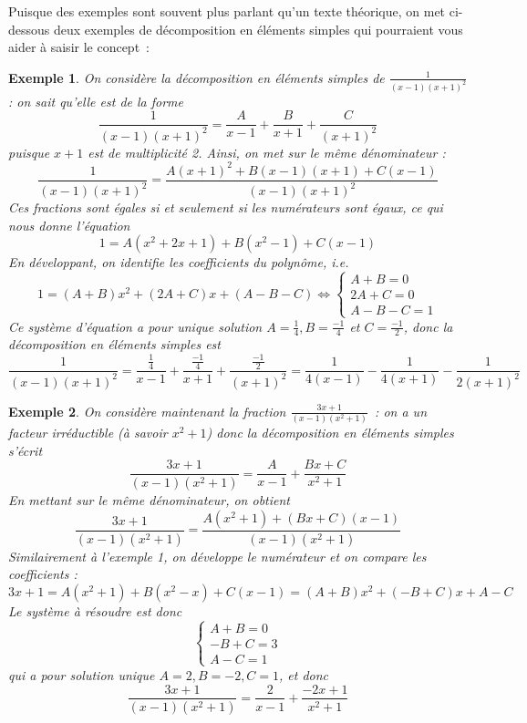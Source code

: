 \documentclass{article}
\newtheorem{example}{Exemple}
\begin{document}
Puisque des exemples sont souvent plus parlant qu'un texte théorique, on met ci-dessous deux exemples de décomposition en éléments simples qui pourraient vous aider à saisir le concept~:

\begin{example}
On considère la décomposition en éléments simples de $\frac{1}{(x-1)(x+1)^2}$ : on sait qu'elle est de la forme
\[
\frac{1}{(x-1)(x+1)^2} = \frac{A}{x-1} + \frac{B}{x+1} + \frac{C}{(x+1)^2}
\]
puisque $x+1$ est de multiplicité 2. Ainsi, on met sur le même dénominateur :
\[
\frac{1}{(x-1)(x+1)^2} = \frac{A(x+1)^2 + B(x-1)(x+1) + C(x-1)}{(x-1)(x+1)^2}    
\]
Ces fractions sont égales si et seulement si les numérateurs sont égaux, ce qui nous donne l'équation
\[
1 = A(x^2 + 2x + 1) + B(x^2 - 1) + C(x-1)
\]
En développant, on identifie les coefficients du polynôme, i.e.
\[
1 = (A+B)x^2 + (2A+C)x + (A-B-C) \iff \begin{cases}
A + B = 0 \\
2A + C = 0 \\
A-B-C = 1
\end{cases}
\]
Ce système d'équation a pour unique solution $A = \frac{1}{4}, B = \frac{-1}{4}$ et $C = \frac{-1}{2}$, donc la décomposition en éléments simples est
\[
\frac{1}{(x-1)(x+1)^2} = \frac{\frac{1}{4}}{x-1} + \frac{\frac{-1}{4}}{x+1} + \frac{\frac{-1}{2}}{(x+1)^2} = \frac{1}{4(x-1)} - \frac{1}{4(x+1)} - \frac{1}{2(x+1)^2}
\]
\end{example}

\begin{example}
On considère maintenant la fraction $\frac{3x+1}{(x-1)(x^2+1)}$~: on a un facteur irréductible (à savoir $x^2+1$) donc la décomposition en éléments simples s'écrit
\[
\frac{3x+1}{(x-1)(x^2+1)} = \frac{A}{x-1} + \frac{Bx+C}{x^2+1}
\]
En mettant sur le même dénominateur, on obtient
\[
\frac{3x+1}{(x-1)(x^2+1)} = \frac{A(x^2+1) + (Bx+C)(x-1)}{(x-1)(x^2+1)}
\]
Similairement à l'exemple 1, on développe le numérateur et on compare les coefficients :
\[
3x+1 = A(x^2 + 1) + B(x^2-x) + C(x-1) = (A+B)x^2 + (-B+C)x + A - C
\]
Le système à résoudre est donc 
\[
\begin{cases}
A + B = 0 \\
- B + C = 3 \\
A - C = 1
\end{cases}
\]
qui a pour solution unique $A = 2, B = -2, C = 1$, et donc
\[
\frac{3x+1}{(x-1)(x^2+1)} = \frac{2}{x-1} + \frac{-2x+1}{x^2+1}
\]
\end{example}
\end{document}
